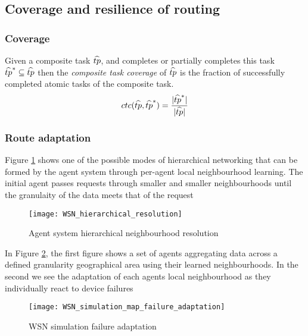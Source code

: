 
\subsection{Coverage and resilience of routing}

\subsubsection{Coverage}

\begin{definition}
	Given a composite task $\varCompositeTask{}{}$, and completes or partially completes this task $\varCompositeTask{}{*} \subseteq \varCompositeTask{}{}$ then the \textit{composite task coverage} of $\varCompositeTask{}{}$ is the fraction of successfully completed atomic tasks of the composite task.
	\begin{equation}
		\functionCompositeTaskCoverage{}{} = \frac{
			\funcSize{\varCompositeTask{}{*}
			}
		}{
			\funcSize{\varCompositeTask{}{}
			}
		}
	\end{equation}
\end{definition}


\subsubsection{Route adaptation}
Figure \ref{fig:wsnhierarchicalresolution} shows one of the possible modes of hierarchical networking that can be formed by the agent system through per-agent local neighbourhood learning. The initial agent passes requests through smaller and smaller neighbourhoods until the granulaity of the data meets that of the request

\begin{figure}[]
	\centering
	\texttt{[image: WSN\_hierarchical\_resolution]}
	\caption{Agent system hierarchical neighbourhood resolution}
	\label{fig:wsnhierarchicalresolution}
\end{figure}
In Figure \ref{fig:wsnsimulationmapfailureadaptation}, the first figure shows a set of agents aggregating data across a defined granularity geographical area using their learned neighbourhoods. In the second we see the adaptation of each agents local neighbourhood as they individually react to device failures
\begin{figure}[]
	\centering
	\texttt{[image: WSN\_simulation\_map\_failure\_adaptation]}
	\caption{WSN simulation failure adaptation}
	\label{fig:wsnsimulationmapfailureadaptation}
\end{figure}

